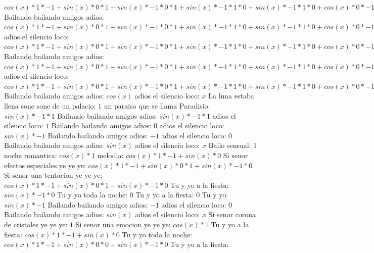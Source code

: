 \documentclass{article}
\begin{document}
${{{cos(x)*1*-1+sin(x)*0}*1+sin(x)*-1*0}*1+sin(x)*-1*1*0+sin(x)*-1*1*0+cos(x)*0}*-1+{sin(x)*-1*1*1+cos(x)*0}*0+{sin(x)*-1*1*1+cos(x)*0}*0+cos(x)*1*0$ Bailando bailando amigos adios: ${{{cos(x)*1*-1+sin(x)*0}*1+sin(x)*-1*0}*1+sin(x)*-1*1*0+sin(x)*-1*1*0+cos(x)*0}*-1+{sin(x)*-1*1*1+cos(x)*0}*0+{sin(x)*-1*1*1+cos(x)*0}*0+cos(x)*1*0+{sin(x)*-1*1*1+cos(x)*0}*0+cos(x)*1*0+cos(x)*1*0+sin(x)*0$ adios el silencio loco: ${{{{cos(x)*1*-1+sin(x)*0}*1+sin(x)*-1*0}*1+sin(x)*-1*1*0+sin(x)*-1*1*0+cos(x)*0}*-1+{sin(x)*-1*1*1+cos(x)*0}*0+{sin(x)*-1*1*1+cos(x)*0}*0+cos(x)*1*0+{sin(x)*-1*1*1+cos(x)*0}*0+cos(x)*1*0+cos(x)*1*0+sin(x)*0}*1+{{sin(x)*-1*1*1+cos(x)*0}*-1+cos(x)*1*0+cos(x)*1*0+sin(x)*0}*0$ Bailando bailando amigos adios: ${{{{cos(x)*1*-1+sin(x)*0}*1+sin(x)*-1*0}*1+sin(x)*-1*1*0+sin(x)*-1*1*0+cos(x)*0}*-1+{sin(x)*-1*1*1+cos(x)*0}*0+{sin(x)*-1*1*1+cos(x)*0}*0+cos(x)*1*0+{sin(x)*-1*1*1+cos(x)*0}*0+cos(x)*1*0+cos(x)*1*0+sin(x)*0}*1+{{sin(x)*-1*1*1+cos(x)*0}*-1+cos(x)*1*0+cos(x)*1*0+sin(x)*0}*0+{{sin(x)*-1*1*1+cos(x)*0}*-1+cos(x)*1*0+cos(x)*1*0+sin(x)*0}*0+{cos(x)*1*-1+sin(x)*0}*0$ adios el silencio loco: ${{{{cos(x)*1*-1+sin(x)*0}*1+sin(x)*-1*0}*1+sin(x)*-1*1*0+sin(x)*-1*1*0+cos(x)*0}*-1+{sin(x)*-1*1*1+cos(x)*0}*0+{sin(x)*-1*1*1+cos(x)*0}*0+cos(x)*1*0+{sin(x)*-1*1*1+cos(x)*0}*0+cos(x)*1*0+cos(x)*1*0+sin(x)*0}*1+{{sin(x)*-1*1*1+cos(x)*0}*-1+cos(x)*1*0+cos(x)*1*0+sin(x)*0}*0+{{sin(x)*-1*1*1+cos(x)*0}*-1+cos(x)*1*0+cos(x)*1*0+sin(x)*0}*0+{cos(x)*1*-1+sin(x)*0}*0+{{sin(x)*-1*1*1+cos(x)*0}*-1+cos(x)*1*0+cos(x)*1*0+sin(x)*0}*0+{cos(x)*1*-1+sin(x)*0}*0+{cos(x)*1*-1+sin(x)*0}*0+sin(x)*-1*0$ Bailando bailando amigos adios: $cos(x)$  \newline adios el silencio loco: $x$ La luna estaba llena sone sone de un palacio: $1$  \newline un paraiso que se llama Paradisio: $sin(x)*-1*1$ Bailando bailando amigos adios: $sin(x)*-1*1$ adios el silencio loco: $1$ Bailando bailando amigos adios: $0$  \newline adios el silencio loco: $sin(x)*-1$ Bailando bailando amigos adios: $-1$ adios el silencio loco: $0$  \newline Bailando bailando amigos adios: $sin(x)$  \newline adios el silencio loco: $x$ Bailo sensual: $1$  \newline noche romantica: $cos(x)*1$ melodia: $cos(x)*1*-1+sin(x)*0$ Si senor efectos especiales ye ye ye: ${cos(x)*1*-1+sin(x)*0}*1+sin(x)*-1*0$ Si senor una tentacion ye ye ye: ${cos(x)*1*-1+sin(x)*0}*1+sin(x)*-1*0$  \newline Tu y yo a la fiesta: $sin(x)*-1*0$ Tu y yo toda la noche: $0$ Tu y yo a la fiesta: $0$  \newline Tu y yo: $sin(x)*-1$ Bailando bailando amigos adios: $-1$ adios el silencio loco: $0$  \newline Bailando bailando amigos adios: $sin(x)$  \newline adios el silencio loco: $x$ Si senor corona de cristales ye ye ye: $1$  \newline Si senor una emocion ye ye ye: $cos(x)*1$ Tu y yo a la fiesta: $cos(x)*1*-1+sin(x)*0$ Tu y yo toda la noche: ${cos(x)*1*-1+sin(x)*0}*0+sin(x)*-1*0$ Tu y yo a la fiesta: 
\end{document}
